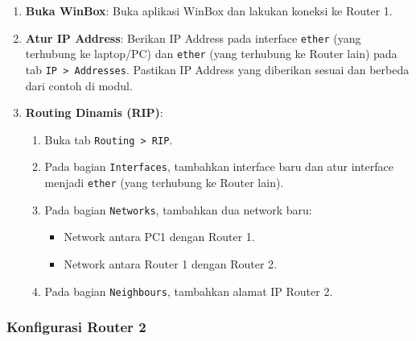 \begin{enumerate}
    \item \textbf{Buka WinBox}: Buka aplikasi WinBox dan lakukan koneksi ke Router 1.
    \item \textbf{Atur IP Address}: Berikan IP Address pada interface \texttt{ether} (yang terhubung ke laptop/PC) dan \texttt{ether} (yang terhubung ke Router lain) pada tab \texttt{IP > Addresses}. Pastikan IP Address yang diberikan sesuai dan berbeda dari contoh di modul.
    \item \textbf{Routing Dinamis (RIP)}:
    \begin{enumerate}
        \item Buka tab \texttt{Routing > RIP}.
        \item Pada bagian \texttt{Interfaces}, tambahkan interface baru dan atur interface menjadi \texttt{ether} (yang terhubung ke Router lain).
        \item Pada bagian \texttt{Networks}, tambahkan dua network baru:
        \begin{itemize}
            \item Network antara PC1 dengan Router 1.
            \item Network antara Router 1 dengan Router 2.
        \end{itemize}
        \item Pada bagian \texttt{Neighbours}, tambahkan alamat IP Router 2.
    \end{enumerate}
\end{enumerate}

\subsubsection*{Konfigurasi Router 2}

